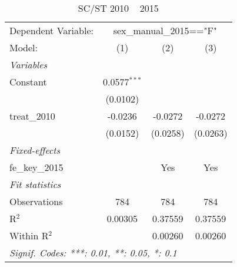 
\begin{table}[htbp]
   \caption{SC/ST 2010 ~ 2015}
   \centering
   \begin{tabular}{lccc}
      \tabularnewline \midrule \midrule
      Dependent Variable: & \multicolumn{3}{c}{sex\_manual\_2015=="F"}\\
      Model:          & (1)            & (2)      & (3)\\  
      \midrule
      \emph{Variables}\\
      Constant        & 0.0577$^{***}$ &          &   \\   
                      & (0.0102)       &          &   \\   
      treat\_2010     & -0.0236        & -0.0272  & -0.0272\\   
                      & (0.0152)       & (0.0258) & (0.0263)\\   
      \midrule
      \emph{Fixed-effects}\\
      fe\_key\_2015   &                & Yes      & Yes\\  
      \midrule
      \emph{Fit statistics}\\
      Observations    & 784            & 784      & 784\\  
      R$^2$           & 0.00305        & 0.37559  & 0.37559\\  
      Within R$^2$    &                & 0.00260  & 0.00260\\  
      \midrule \midrule
      \multicolumn{4}{l}{\emph{Signif. Codes: ***: 0.01, **: 0.05, *: 0.1}}\\
   \end{tabular}
\end{table}


